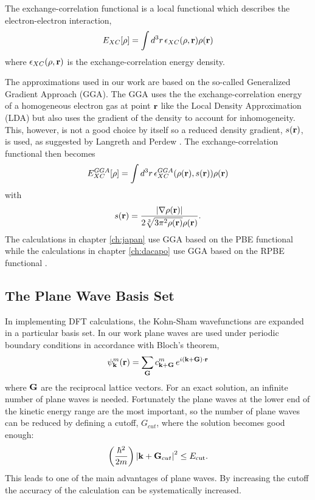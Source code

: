 The exchange-correlation functional is a local functional which describes the electron-electron interaction,
\begin{equation}
\label{eq:XCfunctional}
 E_{XC}[\rho] = \int d^3r\, \epsilon_{XC}(\rho, \mathbf{r})\rho(\mathbf{r})
\end{equation}
where $\epsilon_{XC}(\rho, \mathbf{r})$ is the exchange-correlation energy density.

The approximations used in our work are based on the so-called Generalized Gradient Approach (GGA). The GGA uses the the exchange-correlation energy of a homogeneous electron gas at point $\mathbf{r}$ like the Local Density Approximation (LDA) \cite{kohn1965} but also uses the gradient of the density to account for inhomogeneity. This, however, is not a good choice by itself so a reduced density gradient, $s(\mathbf{r})$, is used, as suggested by Langreth and Perdew \cite{langreth1977}. The exchange-correlation functional then becomes
\begin{equation}
  E_{XC}^{GGA}[\rho] = \int d^3r\, \epsilon_{XC}^{GGA}(\rho(\mathbf{r}), s(\mathbf{r}))\rho(\mathbf{r})
\end{equation}
with
\begin{equation}
\label{eq:GGAreducedDensityGradient}
 s(\mathbf{r}) = \frac{\left|\nabla \rho(\mathbf{r})\right|}{2\sqrt[3]{3\pi^2\rho(\mathbf{r})} \rho(\mathbf{r})}.
\end{equation}
The calculations in chapter \ref{ch:japan} use GGA based on the PBE functional \cite{perdew1996} while the calculations in chapter \ref{ch:dacapo} use GGA based on the RPBE functional \cite{hammer1999}.

\subsection{The Plane Wave Basis Set}
In implementing DFT calculations, the Kohn-Sham wavefunctions are expanded in a particular basis set. In our work plane waves are used under periodic boundary conditions in accordance with Bloch's theorem,
\begin{equation}
\label{eq:blochsTherom}
 \psi_{\mathbf{k}}^{m}(\mathbf{r}) = \sum_{\mathbf{G}}c_{\mathbf{k} + \mathbf{G}}^m\, e^{i(\mathbf{k}+\mathbf{G})\cdot\mathbf{r}}
\end{equation}
where $\mathbf{G}$ are the reciprocal lattice vectors. %
For an exact solution, an infinite number of plane waves is needed. Fortunately the plane waves at the lower end of the kinetic energy range are the most important, so the number of plane waves can be reduced by defining a cutoff, $G_{cut}$, where the solution becomes good enough:
\begin{equation}
 \left( \frac{\hbar^2}{2m} \right) \left| \mathbf{k} + \mathbf{G}_{cut} \right|^2 \le E_\mathrm{cut}.
\end{equation}
This leads to one of the main advantages of plane waves. By increasing the cutoff the accuracy of the calculation can be systematically increased. 

